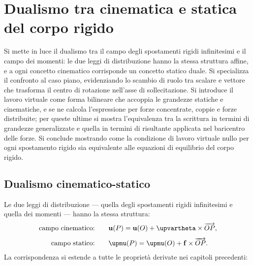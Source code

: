 \graphicspath{{Parti/P03-Meccanica_SR/C03-Dualita_CR/Figure/}}
\chapter{Dualismo tra cinematica e statica del corpo rigido}\label{cap:dualismo_CR}


\begin{sommario}
	Si mette in luce il dualismo tra il campo degli spostamenti	rigidi infinitesimi e il campo dei momenti: le due leggi di	distribuzione hanno la stessa struttura affine, e a ogni concetto cinematico corrisponde un concetto statico duale.	Si specializza il confronto al caso piano, evidenziando lo	scambio di ruolo tra scalare e vettore che trasforma il centro di rotazione nell'asse di sollecitazione. Si introduce il lavoro virtuale come forma bilineare che
	accoppia le grandezze statiche e cinematiche, e se ne	calcola l'espressione per forze concentrate, coppie e
	forze distribuite; per queste ultime si mostra	l'equivalenza tra la scrittura in termini di grandezze
	generalizzate e quella in termini di risultante applicata	nel baricentro delle forze. Si conclude mostrando come la	condizione di lavoro virtuale nullo per ogni spostamento	rigido sia equivalente alle equazioni di equilibrio del	corpo rigido.
\end{sommario}

\section{Dualismo cinematico-statico}\label{sec:dualismo}

Le due leggi di distribuzione --- quella degli spostamenti
rigidi infinitesimi e quella dei momenti --- hanno la stessa
struttura:
\begin{equation}\label{eq:dualismo}
	\begin{aligned}
		\text{campo cinematico:} &\qquad
		\ub(P) = \ub(O)
		+ \bm{\upvartheta} \times \overrightarrow{OP}, \\[4pt]
		\text{campo statico:} &\qquad
		\bm{\upmu}(P) = \bm{\upmu}(O)
		+ \fb \times \overrightarrow{OP}.
	\end{aligned}
\end{equation}
La corrispondenza si estende a tutte le proprietà derivate
nei capitoli precedenti:

